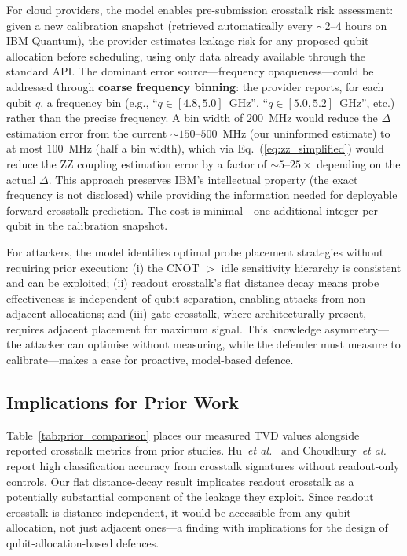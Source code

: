 \documentclass[ASNA,twocolumn]{USG}
\begin{document}
For cloud providers, the model enables pre-submission crosstalk risk assessment: given a new calibration snapshot (retrieved automatically every $\sim 2$--$4$ hours on IBM Quantum), the provider estimates leakage risk for any proposed qubit allocation before scheduling, using only data already available through the standard API. The dominant error source---frequency opaqueness---could be addressed through \textbf{coarse frequency binning}: the provider reports, for each qubit $q$, a frequency bin (e.g., ``$q \in [4.8, 5.0]$~GHz'', ``$q \in [5.0, 5.2]$~GHz'', etc.) rather than the precise frequency. A bin width of $200$~MHz would reduce the $\Delta$ estimation error from the current $\sim 150$--$500$~MHz (our uninformed estimate) to at most $100$~MHz (half a bin width), which via Eq.~(\ref{eq:zz_simplified}) would reduce the ZZ coupling estimation error by a factor of $\sim 5$--$25\times$ depending on the actual $\Delta$. This approach preserves IBM's intellectual property (the exact frequency is not disclosed) while providing the information needed for deployable forward crosstalk prediction. The cost is minimal---one additional integer per qubit in the calibration snapshot.

For attackers, the model identifies optimal probe placement strategies without requiring prior execution: (i) the CNOT $>$ idle sensitivity hierarchy is consistent and can be exploited; (ii) readout crosstalk's flat distance decay means probe effectiveness is independent of qubit separation, enabling attacks from non-adjacent allocations; and (iii) gate crosstalk, where architecturally present, requires adjacent placement for maximum signal. This knowledge asymmetry---the attacker can optimise without measuring, while the defender must measure to calibrate---makes a case for proactive, model-based defence.

\subsection{Implications for Prior Work}

Table~\ref{tab:prior_comparison} places our measured TVD values alongside reported crosstalk metrics from prior studies. Hu~\emph{et al.}~\cite{hu2025swap} and Choudhury~\emph{et al.}~\cite{choudhury2024crosstalk} report high classification accuracy from crosstalk signatures without readout-only controls. Our flat distance-decay result implicates readout crosstalk as a potentially substantial component of the leakage they exploit. Since readout crosstalk is distance-independent, it would be accessible from any qubit allocation, not just adjacent ones---a finding with implications for the design of qubit-allocation-based defences.
\end{document}

